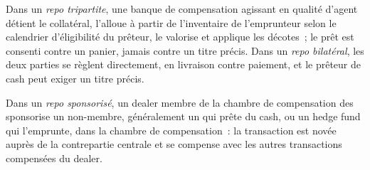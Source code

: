 \begin{definition}\label{def:m2:repo-and-specials:triparty}
Dans un \emph{repo tripartite}, une banque de compensation agissant en
qualité d'agent détient le collatéral, l'alloue à partir de l'inventaire de l'emprunteur
selon le calendrier d'éligibilité du prêteur, le valorise et applique les
décotes~; le prêt est consenti contre un panier, jamais contre un titre précis.
Dans un \emph{repo bilatéral}, les deux parties se règlent directement,
en livraison contre paiement, et le prêteur de cash peut exiger un titre précis.
\end{definition}

\begin{definition}\label{def:m2:repo-and-specials:sponsored}
Dans un \emph{repo sponsorisé}, un dealer membre de
la chambre de compensation des  sponsorise un non-membre, généralement un 
qui prête du cash, ou un hedge fund qui l'emprunte, dans la chambre de compensation~: la
transaction est novée auprès de la contrepartie centrale et se compense avec les
autres transactions compensées du dealer.
\end{definition}

